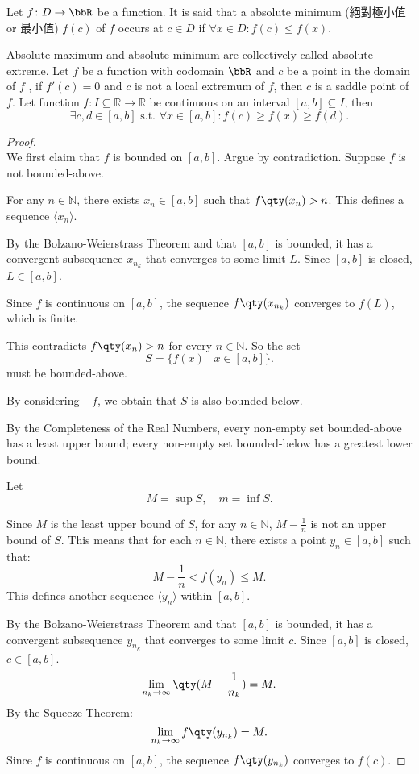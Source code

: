 \documentclass[a4paper,12pt]{report}
\begin{document}
\begin{itemize}
\begin{itemize}
Let $f\colon D\to\bbR$ be a function. It is said that a absolute minimum (絕對極小值 or 最小值) \( f(c) \) of \(f\) occurs at $c\in D$ if \( \forall x\in D\colon f(c) \leq f(x) \).

Absolute maximum and absolute minimum are collectively called absolute extreme.
Let $f$ be a function with codomain $\bbR$ and \( c \) be a point in the domain of $f$ , if \( f'(c) = 0 \) and $c$ is not a local extremum of $f$, then $c$ is a saddle point of $f$.
Let function $f\colon I\subseteq\mathbb{R}\to\mathbb{R}$ be continuous on an interval $[a,b]\subseteq I$, then
\[\exists c,d \in [a, b] \text{\ s.t.\ }\forall x \in [a, b]\colon f(c)\geq f(x)\geq f(d).\]
\begin{proof}\mbox{}\\
We first claim that $f$ is bounded on $[a,b]$. Argue by contradiction. Suppose $f$ is not bounded-above.

For any $n\in\mathbb{N}$, there exists $x_n\in [a,b]$ such that $f\qty(x_n)>n$. This defines a sequence $\langle x_n\rangle$.

By the Bolzano-Weierstrass Theorem and that $[a,b]$ is bounded, it has a convergent subsequence $x_{n_k}$ that converges to some limit $L$. Since $[a,b]$ is closed, $L\in [a,b]$.

Since $f$ is continuous on $[a,b]$, the sequence $f\qty(x_{n_k})$ converges to $f(L)$, which is finite.

This contradicts $f\qty(x_n)>n$ for every $n\in\mathbb{N}$. So the set
\[S=\{f(x)\mid x\in [a,b]\}.\]
must be bounded-above.

By considering $-f$, we obtain that $S$ is also bounded-below.

By the Completeness of the Real Numbers, every non-empty set bounded-above has a least upper bound; every non-empty set bounded-below has a greatest lower bound.

Let
\[M=\sup S,\quad m=\inf S.\]

Since $M$ is the least upper bound of $S$, for any $n\in\mathbb{N}$, $M-\frac{1}{n}$ is not an upper bound of $S$. This means that for each $n\in\mathbb{N}$, there exists a point $y_n\in [a,b]$ such that:
\[M-\frac{1}{n}<f(y_n)\leq M.\]
This defines another sequence $\langle y_n\rangle$ within $[a, b]$.

By the Bolzano-Weierstrass Theorem and that $[a,b]$ is bounded, it has a convergent subsequence $y_{n_k}$ that converges to some limit $c$. Since $[a,b]$ is closed, $c\in [a,b]$.
\[\lim_{n_k\to \infty}\qty(M - \frac{1}{n_k}) = M.\]
By the Squeeze Theorem:
\[\lim_{n_k \to \infty} f\qty(y_{n_k}) = M.\]
Since $f$ is continuous on $[a,b]$, the sequence $f\qty(y_{n_k})$ converges to $f(c)$.


\end{proof}
\end{itemize}
\end{itemize}
\end{document}
